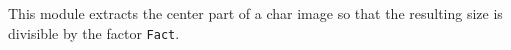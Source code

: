 This module extracts the center part of a char image
so that the resulting size is divisible by the factor \verb+Fact+.
